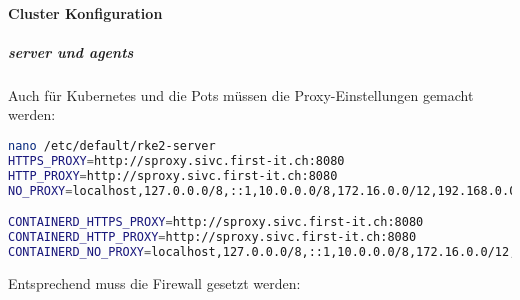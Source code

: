 \paragraph{Cluster Konfiguration}
\subparagraph{server und agents}
Auch für Kubernetes und die Pots müssen die Proxy-Einstellungen gemacht werden:
\lstset{style=gra_codestyle}
\begin{lstlisting}[language=bash, caption=rke2 server proxy,captionpos=b,label={lst:rke2-server-proxy},breaklines=true]
nano /etc/default/rke2-server
HTTPS_PROXY=http://sproxy.sivc.first-it.ch:8080
HTTP_PROXY=http://sproxy.sivc.first-it.ch:8080
NO_PROXY=localhost,127.0.0.0/8,::1,10.0.0.0/8,172.16.0.0/12,192.168.0.0/16

CONTAINERD_HTTPS_PROXY=http://sproxy.sivc.first-it.ch:8080
CONTAINERD_HTTP_PROXY=http://sproxy.sivc.first-it.ch:8080
CONTAINERD_NO_PROXY=localhost,127.0.0.0/8,::1,10.0.0.0/8,172.16.0.0/12,192.168.0.0/16
\end{lstlisting}
%
%
%
%
%
%
%
%
Entsprechend muss die Firewall gesetzt werden:
\lstset{style=gra_codestyle}
